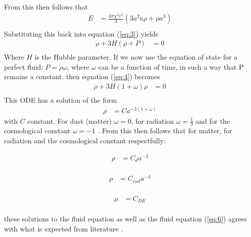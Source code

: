 \documentclass[a4paper, 11pt]{FSKH_623_Report}
\numberwithin{equation}{section}
\begin{document}
From this then follows that
\begin{equation}
\begin{split}
\dot{E} &= \frac{4\pi\chi^{3} c^{2}}{3}\left(3a^{2}\dot{a}\rho+\dot{\rho}a^{3}\right)\\
\end{split}
\end{equation}
Substituting this back into equation (\ref{eq:3}) yields
\begin{equation}\label{eq:4}
\begin{split}
\dot{\rho}+3H\left(\rho+P\right) &= 0\\
\end{split}
\end{equation}
Where $H$ is the Hubble parameter.
If we now use the equation of state for a perfect fluid: $P=\rho\omega$, where $\omega$ can be a function of time, in such a way that P remains a constant.
then equation (\ref{eq:4}) becomes
\begin{equation}\label{eq:6}
\begin{split}
\dot{\rho}+3H\left(1+\omega\right)\rho &= 0\\
\end{split}
\end{equation}
This ODE has a solution of the form  
\begin{equation}
\begin{split}
\rho &= Ca^{-3\left(1+\omega\right)}
\end{split}
\end{equation}
with $C$ constant.
For dust (matter) $\omega=0$, for radiation $\omega=\frac{1}{3}$ and for the cosmological constant $\omega=-1$ \citep{notes4, GRFD}. From this then follows that for matter, for radiation and the cosmological constant respectfully: 
\begin{multicols}{3}
\begin{equation}
\begin{split}
\rho &= C_{d}a^{-3}\\
\end{split}
\end{equation}

\begin{equation}
\begin{split}
\rho &= C_{rad}a^{-4}\\
\end{split}
\end{equation}

\begin{equation}
\begin{split}
\rho &= C_{DE}\\
\end{split}
\end{equation}
\end{multicols}
these solutions to the fluid equation as well as the fluid equation (\ref{eq:6}) agrees with what is expected from literature \citep{GRFD, ITC}. 
\end{document}

